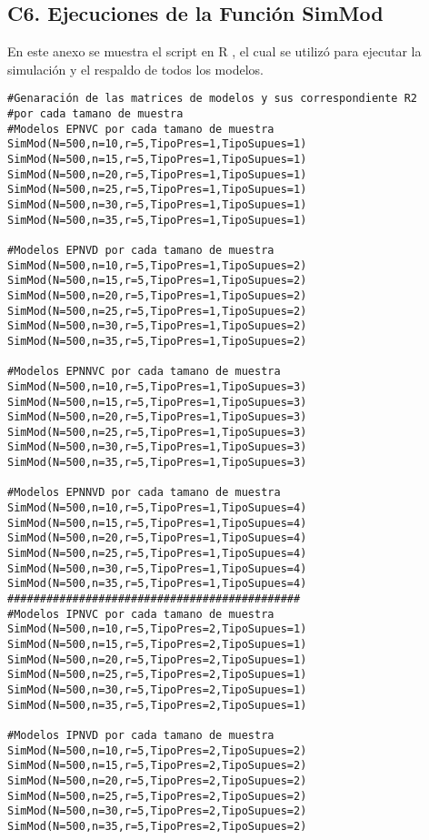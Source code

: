 \newpage
\subsection*{C6. Ejecuciones de la Función SimMod}

En este anexo se muestra el script en R \parencite{R-2024}, el cual se utilizó para ejecutar la simulación y el respaldo de todos los modelos.\\ 


\begin{verbatim}
#Genaración de las matrices de modelos y sus correspondiente R2 
#por cada tamano de muestra
#Modelos EPNVC por cada tamano de muestra
SimMod(N=500,n=10,r=5,TipoPres=1,TipoSupues=1)
SimMod(N=500,n=15,r=5,TipoPres=1,TipoSupues=1)
SimMod(N=500,n=20,r=5,TipoPres=1,TipoSupues=1)
SimMod(N=500,n=25,r=5,TipoPres=1,TipoSupues=1)
SimMod(N=500,n=30,r=5,TipoPres=1,TipoSupues=1)
SimMod(N=500,n=35,r=5,TipoPres=1,TipoSupues=1)

#Modelos EPNVD por cada tamano de muestra
SimMod(N=500,n=10,r=5,TipoPres=1,TipoSupues=2)
SimMod(N=500,n=15,r=5,TipoPres=1,TipoSupues=2)
SimMod(N=500,n=20,r=5,TipoPres=1,TipoSupues=2)
SimMod(N=500,n=25,r=5,TipoPres=1,TipoSupues=2)
SimMod(N=500,n=30,r=5,TipoPres=1,TipoSupues=2)
SimMod(N=500,n=35,r=5,TipoPres=1,TipoSupues=2)

#Modelos EPNNVC por cada tamano de muestra
SimMod(N=500,n=10,r=5,TipoPres=1,TipoSupues=3)
SimMod(N=500,n=15,r=5,TipoPres=1,TipoSupues=3)
SimMod(N=500,n=20,r=5,TipoPres=1,TipoSupues=3)
SimMod(N=500,n=25,r=5,TipoPres=1,TipoSupues=3)
SimMod(N=500,n=30,r=5,TipoPres=1,TipoSupues=3)
SimMod(N=500,n=35,r=5,TipoPres=1,TipoSupues=3)

#Modelos EPNNVD por cada tamano de muestra
SimMod(N=500,n=10,r=5,TipoPres=1,TipoSupues=4)
SimMod(N=500,n=15,r=5,TipoPres=1,TipoSupues=4)
SimMod(N=500,n=20,r=5,TipoPres=1,TipoSupues=4)
SimMod(N=500,n=25,r=5,TipoPres=1,TipoSupues=4)
SimMod(N=500,n=30,r=5,TipoPres=1,TipoSupues=4)
SimMod(N=500,n=35,r=5,TipoPres=1,TipoSupues=4)
#############################################
#Modelos IPNVC por cada tamano de muestra
SimMod(N=500,n=10,r=5,TipoPres=2,TipoSupues=1)
SimMod(N=500,n=15,r=5,TipoPres=2,TipoSupues=1)
SimMod(N=500,n=20,r=5,TipoPres=2,TipoSupues=1)
SimMod(N=500,n=25,r=5,TipoPres=2,TipoSupues=1)
SimMod(N=500,n=30,r=5,TipoPres=2,TipoSupues=1)
SimMod(N=500,n=35,r=5,TipoPres=2,TipoSupues=1)

#Modelos IPNVD por cada tamano de muestra
SimMod(N=500,n=10,r=5,TipoPres=2,TipoSupues=2)
SimMod(N=500,n=15,r=5,TipoPres=2,TipoSupues=2)
SimMod(N=500,n=20,r=5,TipoPres=2,TipoSupues=2)
SimMod(N=500,n=25,r=5,TipoPres=2,TipoSupues=2)
SimMod(N=500,n=30,r=5,TipoPres=2,TipoSupues=2)
SimMod(N=500,n=35,r=5,TipoPres=2,TipoSupues=2)


\end{verbatim}
